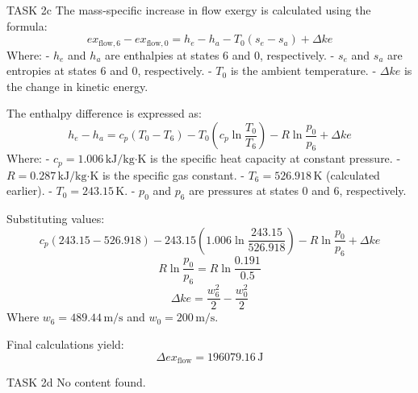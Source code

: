 TASK 2c  
The mass-specific increase in flow exergy is calculated using the formula:  
\[
ex_{\text{flow},6} - ex_{\text{flow},0} = h_e - h_a - T_0(s_e - s_a) + \Delta ke
\]  
Where:  
- \( h_e \) and \( h_a \) are enthalpies at states 6 and 0, respectively.  
- \( s_e \) and \( s_a \) are entropies at states 6 and 0, respectively.  
- \( T_0 \) is the ambient temperature.  
- \( \Delta ke \) is the change in kinetic energy.

The enthalpy difference is expressed as:  
\[
h_e - h_a = c_p(T_0 - T_6) - T_0 \left( c_p \ln \frac{T_0}{T_6} \right) - R \ln \frac{p_0}{p_6} + \Delta ke
\]  
Where:  
- \( c_p = 1.006 \, \text{kJ/kg·K} \) is the specific heat capacity at constant pressure.  
- \( R = 0.287 \, \text{kJ/kg·K} \) is the specific gas constant.  
- \( T_6 = 526.918 \, \text{K} \) (calculated earlier).  
- \( T_0 = 243.15 \, \text{K} \).  
- \( p_0 \) and \( p_6 \) are pressures at states 0 and 6, respectively.  

Substituting values:  
\[
c_p(243.15 - 526.918) - 243.15 \left( 1.006 \ln \frac{243.15}{526.918} \right) - R \ln \frac{p_0}{p_6} + \Delta ke
\]  
\[
R \ln \frac{p_0}{p_6} = R \ln \frac{0.191}{0.5}
\]  
\[
\Delta ke = \frac{w_6^2}{2} - \frac{w_0^2}{2}
\]  
Where \( w_6 = 489.44 \, \text{m/s} \) and \( w_0 = 200 \, \text{m/s} \).  

Final calculations yield:  
\[
\Delta ex_{\text{flow}} = 196079.16 \, \text{J}
\]  

TASK 2d  
No content found.